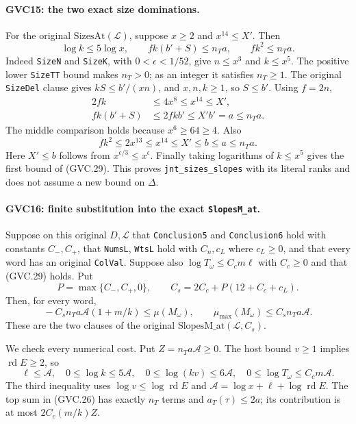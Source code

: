 \paragraph{GVC15: the two exact size dominations.}
\label{claim:GVC15}
For the original $\mathrm{SizesAt}(\mathcal L)$, suppose
$x\ge2$ and $x^{14}\le X'$. Then
\[
 \log k\le5\log x,\qquad
 fk(b'+S)\le n_Ta,\qquad fk^2\le n_Ta.                       \tag{GVC.29}
\]
Indeed \texttt{SizeN} and \texttt{SizeK}, with
$0<\epsilon<1/52$, give $n\le x^3$ and $k\le x^5$.
The positive lower \texttt{SizeTT} bound makes $n_T>0$;
as an integer it satisfies $n_T\ge1$.
The original \texttt{SizeDel} clause gives
$kS\le b'/(xn)$, and $x,n,k\ge1$, so $S\le b'$.
Using $f=2n$,
\[
 \begin{split}
 2fk&\le4x^8\le x^{14}\le X',\\
 fk(b'+S)&\le2fkb'\le X'b'=a\le n_Ta.
 \end{split}
\]
The middle comparison holds because $x^6\ge64\ge4$.
Also
\[
 fk^2\le2x^{13}\le x^{14}\le X'\le b\le a\le n_Ta.
\]
Here $X'\le b$ follows from $x^{\epsilon/3}\le x^\epsilon$.
Finally taking logarithms of $k\le x^5$ gives the first bound
of (GVC.29). This proves \texttt{jnt\_sizes\_slopes} with its
literal ranks and does not assume a new bound on $\Delta$.

\paragraph{GVC16: finite substitution into the exact \texttt{SlopesM\_at}.}
\label{claim:GVC16}
Suppose on this original $D,\mathcal L$ that
\texttt{Conclusion5} and \texttt{Conclusion6} hold with constants
$C_-,C_+$, that \texttt{NumsL}, \texttt{WtsL} hold with
$C_n,c_L$ where $c_L\ge0$, and that every word has an original
\texttt{ColVal}. Suppose also
$\log T_\omega\le C_cm\ell$ with $C_c\ge0$ and that (GVC.29)
holds. Put
\[
 P=\max\{C_-,C_+,0\},\qquad
                  C_s=2C_c+P(12+C_c+c_L).                  \tag{GVC.30}
\]
Then, for every word,
\[
 \boxed{\quad
 -C_sn_Ta\mathcal A(1+m/k)\le\mu(M_\omega),\qquad
 \mu_{\max}(M_\omega)\le C_sn_Ta\mathcal A .
 \quad}                                                      \tag{GVC.31}
\]
These are the two clauses of the original
$\mathrm{SlopesM\_at}(\mathcal L,C_s)$.

We check every numerical cost. Put $Z=n_Ta\mathcal A\ge0$.
The host bound $v\ge1$ implies $\operatorname{rd}E\ge2$, so
\[
 \ell\le\mathcal A,\quad
 0\le\log k\le5\mathcal A,\quad
 0\le\log(kv)\le6\mathcal A,\quad
 0\le\log T_\omega\le C_cm\mathcal A .
\]
The third inequality uses
$\log v\le\log\operatorname{rd}E$ and
$\mathcal A=\log x+\ell+\log\operatorname{rd}E$.
The top sum in (GVC.26) has exactly $n_T$ terms and
$a_T(\tau)\le2a$; its contribution is at most
$2C_c(m/k)Z$.

